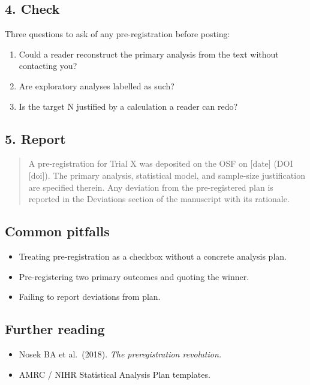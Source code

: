 \documentclass[
]{article}
\providecommand{\tightlist}{%
  \setlength{\itemsep}{0pt}\setlength{\parskip}{0pt}}
\begin{document}
\subsection{4. Check}\label{check}

Three questions to ask of any pre-registration before posting:

\begin{enumerate}
\def\labelenumi{\arabic{enumi}.}
\tightlist
\item
  Could a reader reconstruct the primary analysis from the text without
  contacting you?
\item
  Are exploratory analyses labelled as such?
\item
  Is the target N justified by a calculation a reader can redo?
\end{enumerate}

\subsection{5. Report}\label{report}

\begin{quote}
A pre-registration for Trial X was deposited on the OSF on {[}date{]}
(DOI {[}doi{]}). The primary analysis, statistical model, and
sample-size justification are specified therein. Any deviation from the
pre-registered plan is reported in the Deviations section of the
manuscript with its rationale.
\end{quote}

\subsection{Common pitfalls}\label{common-pitfalls}

\begin{itemize}
\tightlist
\item
  Treating pre-registration as a checkbox without a concrete analysis
  plan.
\item
  Pre-registering two primary outcomes and quoting the winner.
\item
  Failing to report deviations from plan.
\end{itemize}

\subsection{Further reading}\label{further-reading}

\begin{itemize}
\tightlist
\item
  Nosek BA et al.~(2018). \emph{The preregistration revolution.}
\item
  AMRC / NIHR Statistical Analysis Plan templates.
\end{itemize}
\end{document}
